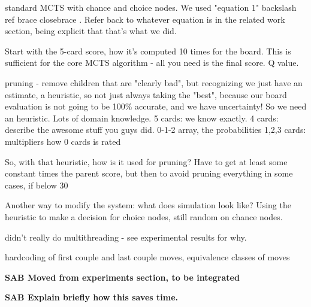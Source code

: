 \documentclass[letterpaper]{article}
\begin{document}
standard MCTS with chance and choice nodes. We used "equation 1"   backslash ref brace  closebrace   . Refer back to whatever equation is in the related work section, being explicit that that's what we did.

Start with the 5-card score, how it's computed 10 times for the board. This is sufficient for the core MCTS algorithm - all you need is the final score. Q value.

pruning - remove children that are "clearly bad", but recognizing we just have an estimate, a heuristic, so not just always taking the "best", because our board evaluation is not going to be 100\% accurate, and we have uncertainty! So we need an heuristic. Lots of domain knowledge.
5 cards: we know exactly.
4 cards: describe the awesome stuff you guys did. 0-1-2 array, the probabilities
1,2,3 cards: multipliers
how 0 cards is rated

So, with that heuristic, how is it used for pruning? Have to get at least some constant times the parent score, but then to avoid pruning everything in some cases, if below 30%

Another way to modify the system: what does simulation look like? Using the heuristic to make a decision for choice nodes, still random on chance nodes.

didn't really do multithreading - see experimental results for why.

hardcoding of first couple and last couple moves, equivalence classes of moves

{\bf SAB Moved from experiments section, to be integrated}

{\bf SAB Explain briefly how this saves time.}
\end{document}
